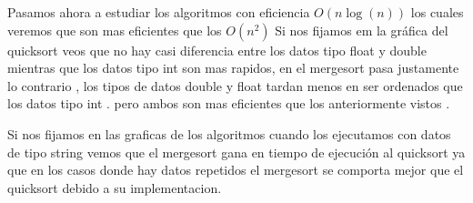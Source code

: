 \documentclass[11pt]{article}
\begin{document}
    Pasamos ahora a estudiar los algoritmos con eficiencia \(O(n\log(n))\) los cuales veremos que son mas eficientes que los \(O(n^2)\)
    Si nos fijamos em la gráfica del quicksort veos que no hay casi diferencia entre los datos tipo float y double mientras que los datos tipo int son mas rapidos, 
    en el mergesort pasa justamente lo contrario , los tipos de datos double y float tardan menos en ser ordenados que los datos tipo int . 
    pero ambos son mas eficientes que los anteriormente vistos . 
    
    Si nos fijamos en las graficas de los algoritmos cuando los ejecutamos con datos de tipo string vemos que el mergesort gana en tiempo de ejecución al
    quicksort ya que en los casos donde hay datos repetidos el mergesort se comporta mejor que el quicksort debido a su implementacion.
\end{document}
